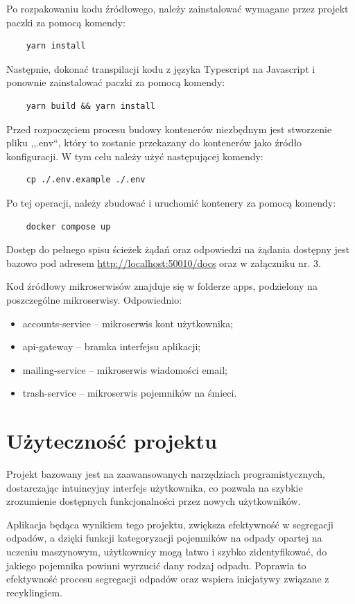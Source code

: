 \documentclass[12pt, a4paper, twoside, openany]{book}
\newcommand{\forceindent}{\leavevmode{\parindent=1.3em\indent}}
\begin{document}
{Po rozpakowaniu kodu źródłowego, należy zainstalować wymagane przez projekt paczki za pomocą komendy:
\begin{lstlisting}
    yarn install
\end{lstlisting}

Następnie, dokonać transpilacji kodu z języka Typescript na Javascript i ponownie zainstalować paczki za pomocą komendy:
\begin{lstlisting}
    yarn build && yarn install
\end{lstlisting}

Przed rozpoczęciem procesu budowy kontenerów niezbędnym jest stworzenie pliku ,,.env``, który to zostanie przekazany do kontenerów jako źródło konfiguracji. W tym celu należy użyć następującej komendy:
\begin{lstlisting}
    cp ./.env.example ./.env
\end{lstlisting}

Po tej operacji, należy zbudować i uruchomić kontenery za pomocą komendy:
\begin{lstlisting}
    docker compose up
\end{lstlisting}

Dostęp do pełnego spisu ścieżek żądań oraz odpowiedzi na żądania dostępny jest bazowo pod adresem \url{http://localhost:50010/docs} oraz w załączniku nr. 3.

Kod źródłowy mikroserwisów znajduje się w folderze apps, podzielony na poszczególne mikroserwisy. Odpowiednio:
\begin{itemize}
    \item accounts-service -- mikroserwis kont użytkownika;
    \item api-gateway -- bramka interfejsu aplikacji;
    \item mailing-service -- mikroserwis wiadomości email;
    \item trash-service -- mikroserwis pojemników na śmieci.
\end{itemize}

\section{Użyteczność projektu}

\forceindent Projekt \topic bazowany jest na zaawansowanych narzędziach programistycznych, dostarczając intuincyjny interfejs użytkownika, co pozwala na szybkie zrozumienie dostępnych funkcjonalności przez nowych użytkowników.

Aplikacja będąca wynikiem tego projektu, zwiększa efektywność w segregacji odpadów, a dzięki funkcji kategoryzacji pojemników na odpady opartej na uczeniu maszynowym, użytkownicy mogą łatwo i szybko zidentyfikować, do jakiego pojemnika powinni wyrzucić dany rodzaj odpadu. Poprawia to efektywność procesu segregacji odpadów oraz wspiera inicjatywy związane z recyklingiem.

}
\end{document}
